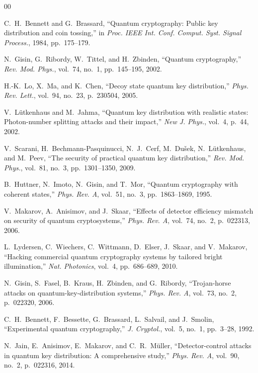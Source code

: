 \documentclass[conference,10pt]{IEEEtran}
\begin{document}

\begin{thebibliography}{00}

C.~H.~Bennett and G.~Brassard, ``Quantum cryptography: Public key distribution and coin tossing,'' in \textit{Proc. IEEE Int. Conf. Comput. Syst. Signal Process.}, 1984, pp.~175--179.

N.~Gisin, G.~Ribordy, W.~Tittel, and H.~Zbinden, ``Quantum cryptography,'' \textit{Rev. Mod. Phys.}, vol.~74, no.~1, pp.~145--195, 2002.

H.-K.~Lo, X.~Ma, and K.~Chen, ``Decoy state quantum key distribution,'' \textit{Phys. Rev. Lett.}, vol.~94, no.~23, p.~230504, 2005.

V.~L\"{u}tkenhaus and M.~Jahma, ``Quantum key distribution with realistic states: Photon-number splitting attacks and their impact,'' \textit{New J. Phys.}, vol.~4, p.~44, 2002.

V.~Scarani, H.~Bechmann-Pasquinucci, N.~J.~Cerf, M.~Du\v{s}ek, N.~L\"{u}tkenhaus, and M.~Peev, ``The security of practical quantum key distribution,'' \textit{Rev. Mod. Phys.}, vol.~81, no.~3, pp.~1301--1350, 2009.

B.~Huttner, N.~Imoto, N.~Gisin, and T.~Mor, ``Quantum cryptography with coherent states,'' \textit{Phys. Rev. A}, vol.~51, no.~3, pp.~1863--1869, 1995.

V.~Makarov, A.~Anisimov, and J.~Skaar, ``Effects of detector efficiency mismatch on security of quantum cryptosystems,'' \textit{Phys. Rev. A}, vol.~74, no.~2, p.~022313, 2006.

L.~Lydersen, C.~Wiechers, C.~Wittmann, D.~Elser, J.~Skaar, and V.~Makarov, ``Hacking commercial quantum cryptography systems by tailored bright illumination,'' \textit{Nat. Photonics}, vol.~4, pp.~686--689, 2010.

N.~Gisin, S.~Fasel, B.~Kraus, H.~Zbinden, and G.~Ribordy, ``Trojan-horse attacks on quantum-key-distribution systems,'' \textit{Phys. Rev. A}, vol.~73, no.~2, p.~022320, 2006.

C.~H.~Bennett, F.~Bessette, G.~Brassard, L.~Salvail, and J.~Smolin, ``Experimental quantum cryptography,'' \textit{J. Cryptol.}, vol.~5, no.~1, pp.~3--28, 1992.

N.~Jain, E.~Anisimov, E.~Makarov, and C.~R.~M\"{u}ller, ``Detector-control attacks in quantum key distribution: A comprehensive study,'' \textit{Phys. Rev. A}, vol.~90, no.~2, p.~022316, 2014.


\end{thebibliography}
\end{document}
